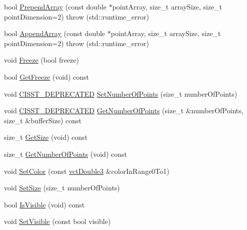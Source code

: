 \begin{DoxyCompactItemize}
\item 
bool \hyperlink{classvct_plot2_d_base_1_1_signal_a3a94c6565eb51445019fb41c4f1dc620}{Prepend\-Array} (const double $\ast$point\-Array, size\-\_\-t array\-Size, size\-\_\-t point\-Dimension=2)  throw (std\-::runtime\-\_\-error)
\item 
bool \hyperlink{classvct_plot2_d_base_1_1_signal_a3ca34a96793c8205973b5e21f6ccee83}{Append\-Array} (const double $\ast$point\-Array, size\-\_\-t array\-Size, size\-\_\-t point\-Dimension=2)  throw (std\-::runtime\-\_\-error)
\item 
void \hyperlink{classvct_plot2_d_base_1_1_signal_a64e25eabe599bfee8ce41e3bb413d10a}{Freeze} (bool freeze)
\item 
bool \hyperlink{classvct_plot2_d_base_1_1_signal_af589f83e274a70f465a700ddb33d95cd}{Get\-Freeze} (void) const 
\item 
void \hyperlink{cmn_portability_8h_a63da7164735f9501be651b1f2bbc0121}{C\-I\-S\-S\-T\-\_\-\-D\-E\-P\-R\-E\-C\-A\-T\-E\-D} \hyperlink{classvct_plot2_d_base_1_1_signal_ac2bc150d895d678d753ac2dd3e99ce25}{Set\-Number\-Of\-Points} (size\-\_\-t number\-Of\-Points)
\item 
void \hyperlink{cmn_portability_8h_a63da7164735f9501be651b1f2bbc0121}{C\-I\-S\-S\-T\-\_\-\-D\-E\-P\-R\-E\-C\-A\-T\-E\-D} \hyperlink{classvct_plot2_d_base_1_1_signal_aa85a26d0ae7863acb04f2d14cb5ed5a5}{Get\-Number\-Of\-Points} (size\-\_\-t \&number\-Of\-Points, size\-\_\-t \&buffer\-Size) const 
\item 
size\-\_\-t \hyperlink{classvct_plot2_d_base_1_1_signal_a3b291e4f8bcfe303086303cabea7ab1d}{Get\-Size} (void) const 
\item 
size\-\_\-t \hyperlink{classvct_plot2_d_base_1_1_signal_aae57a98944162e9eff828fcb35976ae5}{Get\-Number\-Of\-Points} (void) const 
\item 
void \hyperlink{classvct_plot2_d_base_1_1_signal_a0eae059cf46cd21594b8b30082a31a7c}{Set\-Color} (const \hyperlink{vct_fixed_size_vector_types_8h_a4a89122c9d7f72c3f31fe8126e17c3af}{vct\-Double3} \&color\-In\-Range0\-To1)
\item 
void \hyperlink{classvct_plot2_d_base_1_1_signal_ad3e1cca15d592cd22788ec4260da9de5}{Set\-Size} (size\-\_\-t number\-Of\-Points)
\item 
bool \hyperlink{classvct_plot2_d_base_1_1_signal_a106f7f6083ecde72ddbcfa923febc01f}{Is\-Visible} (void) const 
\item 
void \hyperlink{classvct_plot2_d_base_1_1_signal_ad20fd7a374f607e7ae5ddf632c58bc56}{Set\-Visible} (const bool visible)

\end{DoxyCompactItemize}
